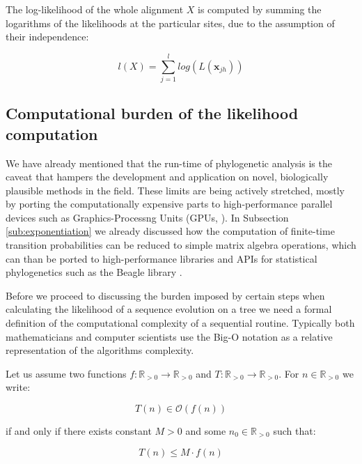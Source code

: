 \documentclass[12pt,twoside]{mitthesis}
\theoremstyle{plain}
\theoremstyle{definition}
\theoremstyle{remark}
\begin{document}
\noindent
The log-likelihood of the whole alignment $X$ is computed by summing the logarithms of the likelihoods at the particular sites, due to the assumption of their independence:

\begin{equation}
l(X)=\underset{j=1}{\overset{l}{\sum}}log\left(L(\mathbf{x}_{jh})\right)
\label{eq:loglikelihood}
\end{equation}

\subsection{Computational burden of the likelihood computation}

We have already mentioned that the run-time of phylogenetic analysis is the caveat that hampers the development and application on novel, biologically plausible methods in the field.
These limits are being actively stretched, mostly by porting the computationally expensive parts to high-performance parallel devices such as Graphics-Processng Units (GPUs, \cite{Nickolls2008}).
In Subsection \ref{sub:exponentiation} we already discussed how the computation of finite-time transition probabilities can be reduced to simple matrix algebra operations, which can than be ported to high-performance libraries and APIs for statistical phylogenetics such as the Beagle library \citep{ Ayres2012, Suchard2009}. 

Before we proceed to discussing the burden imposed by certain steps when calculating the likelihood of a sequence evolution on a tree we need a formal definition of the computational complexity of a sequential routine.
Typically both mathematicians and computer scientists use the Big-O notation as a relative representation of the algorithms complexity.

Let us assume two functions $f:\mathbb{R}_{>0}\rightarrow\mathbb{R}_{>0}$ and $T:\mathbb{R}_{>0}\rightarrow\mathbb{R}_{>0}$. 
For $n \in \mathbb{R}_{>0}$ we write:

\begin{equation}
T(n) \in \mathcal{O}\left(f(n)\right)
\label{eq:bigOh}
\end{equation}

\noindent
if and only if there exists constant $M>0$ and some $n_0 \in \mathbb{R}_{>0}$ such that:

\begin{equation}
T(n)\leq M \cdot f(n)
\end{equation}
\end{document}
